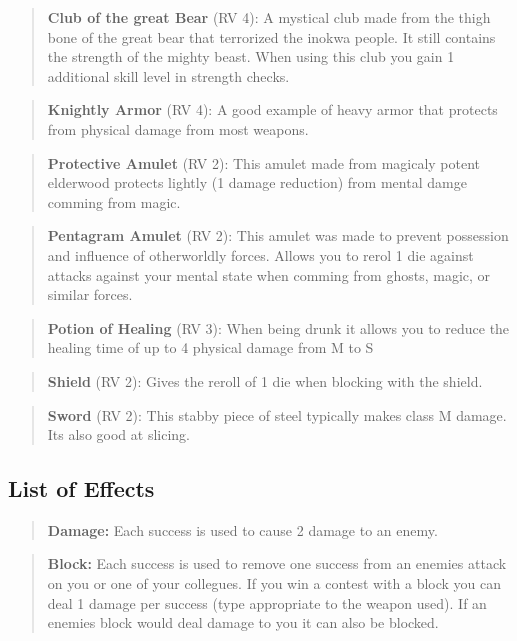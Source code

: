 \documentclass[11pt]{article}
\begin{document}
{\begin{multicols}{2}[]
\begin{quote}
\textbf{Club of the great Bear} (RV 4): A mystical club made from the thigh bone of the great bear that terrorized the inokwa people. It still contains the strength of the mighty beast. When using this club you gain 1 additional skill level in strength checks.
\end{quote}

\begin{quote}
\textbf{Knightly Armor} (RV 4): A good example of heavy armor that protects from physical damage from most weapons.
\end{quote}

\begin{quote}
\textbf{Protective Amulet} (RV 2): This amulet made from magicaly potent elderwood protects lightly (1 damage reduction) from mental damge comming from magic.
\end{quote}

\begin{quote}
\textbf{Pentagram Amulet} (RV 2): This amulet was made to prevent possession and influence of otherworldly forces. Allows you to rerol 1 die against attacks against your mental state when comming from ghosts, magic, or similar forces.
\end{quote}

\begin{quote}
\textbf{Potion of Healing} (RV 3): When being drunk it allows you to reduce the healing time of up to 4 physical damage from M to S
\end{quote}

\begin{quote}
\textbf{Shield} (RV 2): Gives the reroll of 1 die when blocking with the shield.
\end{quote}

\begin{quote}
\textbf{Sword} (RV 2): This stabby piece of steel typically makes class M damage. Its also good at slicing.
\end{quote}

\subsection{List of Effects}
\label{sec:orgcbc704c}
\begin{quote}
\textbf{Damage:} Each success is used to cause 2 damage to an enemy.
\end{quote}

\begin{quote}
\textbf{Block:} Each success is used to remove one success from an enemies attack on you or one of your collegues. If you win a contest with a block you can deal 1 damage per success (type appropriate to the weapon used). If an enemies block would deal damage to you it can also be blocked.
\end{quote}


\end{multicols}}
\end{document}
